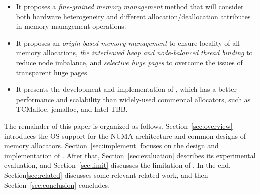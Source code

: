 \begin{itemize}

\item It proposes a \textit{fine-grained memory management} method that will consider both hardware heterogeneity and different allocation/deallocation attributes in memory management operations.

\item It proposes an \textit{origin-based memory management} to ensure locality of all memory allocations,  \textit{the interleaved heap and node-balanced thread binding} to reduce node imbalance, and \textit{selective huge pages} to overcome the issues of transparent huge pages. 

\item It presents the development and implementation of \NM{}, which has a better performance and scalability than widely-used commercial allocators, such as TCMalloc, jemalloc, and Intel TBB. 

\end{itemize}

The remainder of this paper is organized as follows. Section~\ref{sec:overview} introduces the OS support for the NUMA architecture and common designs of memory allocators. Section~\ref{sec:implement} focuses on the design and implementation of \NM{}. After that, Section~\ref{sec:evaluation} describes its experimental evaluation, and Section~\ref{sec:limit} discusses the limitation of \NM{}. In the end, Section\ref{sec:related} discusses some relevant related work, and then Section~\ref{sec:conclusion} concludes. 

